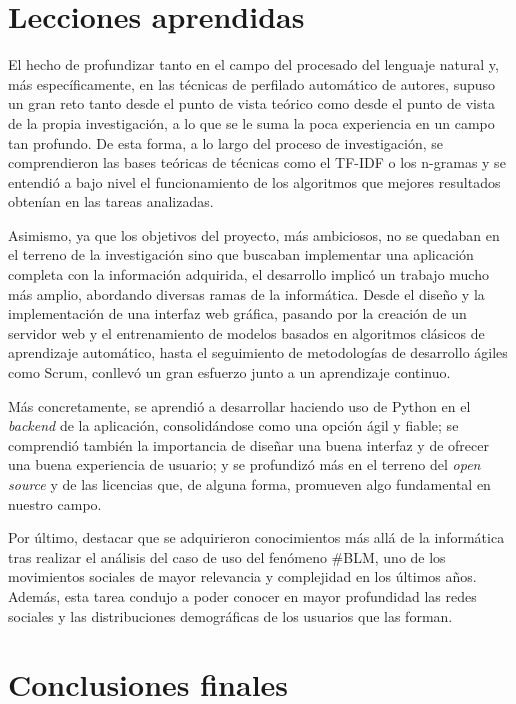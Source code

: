 \section{Lecciones aprendidas}
\label{sec:lecciones_aprendidas}

El hecho de profundizar tanto en el campo del procesado del lenguaje natural y, más específicamente,
en las técnicas de perfilado automático de autores, supuso un gran reto tanto desde el punto de vista teórico como
desde el punto de vista de la propia investigación, a lo que se le suma la poca experiencia en un campo tan profundo. De esta forma, a lo largo del
proceso de investigación, se comprendieron las bases teóricas de técnicas como el TF-IDF o los n-gramas y se entendió a
bajo nivel el funcionamiento de los algoritmos que mejores resultados obtenían en las tareas analizadas.

\bigskip
Asimismo, ya que los objetivos del proyecto, más ambiciosos, no se quedaban en el terreno de la investigación
sino que buscaban implementar una aplicación completa con la información adquirida, el desarrollo implicó un trabajo
mucho más amplio, abordando diversas ramas de la informática. Desde el diseño y la implementación de una interfaz web gráfica,
pasando por la creación de un servidor web y el entrenamiento de modelos basados en algoritmos clásicos
de aprendizaje automático, hasta el seguimiento de metodologías de desarrollo ágiles como Scrum, conllevó
un gran esfuerzo junto a un aprendizaje continuo.

\bigskip
Más concretamente, se aprendió a desarrollar haciendo uso de Python en el \textit{backend} de la aplicación, consolidándose
como una opción ágil y fiable; se comprendió también la importancia de diseñar una buena interfaz
y de ofrecer una buena experiencia de usuario; y se profundizó más en el terreno del \textit{open source} y de las licencias
que, de alguna forma, promueven algo fundamental en nuestro campo.

\bigskip
Por último, destacar que se adquirieron conocimientos más allá de la informática tras realizar el análisis del caso de uso del fenómeno \#BLM,
uno de los movimientos sociales de mayor relevancia y complejidad en los últimos años. Además, esta tarea condujo
a poder conocer en mayor profundidad las redes sociales y las distribuciones demográficas
de los usuarios que las forman.

\section{Conclusiones finales}
\label{sec:conclusiones_finales}

